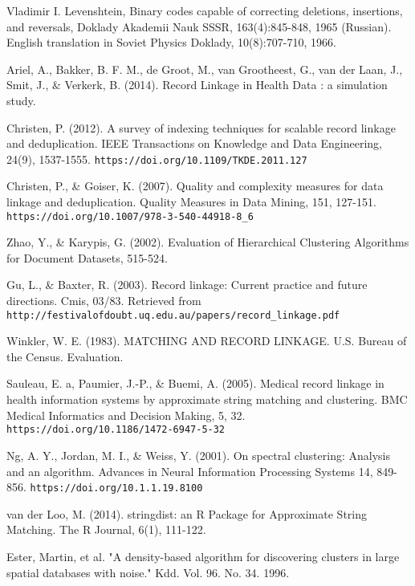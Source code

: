 \documentclass[]{article}
\begin{document}
\begin{thebibliography}{9}

Vladimir I. Levenshtein, Binary codes capable of correcting deletions, insertions, and reversals, Doklady Akademii Nauk SSSR, 163(4):845-848, 1965 (Russian). English translation in Soviet Physics Doklady, 10(8):707-710, 1966.

Ariel, A., Bakker, B. F. M., de Groot, M., van Grootheest, G., van der Laan, J., Smit, J., $\&$ Verkerk, B. (2014). Record Linkage in Health Data : a simulation study.

Christen, P. (2012). A survey of indexing techniques for scalable record linkage and deduplication. IEEE Transactions on Knowledge and Data Engineering, 24(9), 1537-1555. \texttt{https://doi.org/10.1109/TKDE.2011.127}

Christen, P., \& Goiser, K. (2007). Quality and complexity measures for data linkage and deduplication. Quality Measures in Data Mining, 151, 127-151. \texttt{https://doi.org/10.1007/978-3-540-44918-8\_6}

Zhao, Y., \& Karypis, G. (2002). Evaluation of Hierarchical Clustering Algorithms for Document Datasets, 515-524.

Gu, L., \& Baxter, R. (2003). Record linkage: Current practice and future directions. Cmis, 03/83. Retrieved from \texttt{http://festivalofdoubt.uq.edu.au/papers/record\_linkage.pdf}

Winkler, W. E. (1983). MATCHING AND RECORD LINKAGE. U.S. Bureau of the Census. Evaluation.

Sauleau, E. a, Paumier, J.-P., \& Buemi, A. (2005). Medical record linkage in health information systems by approximate string matching and clustering. BMC Medical Informatics and Decision Making, 5, 32. \texttt{https://doi.org/10.1186/1472-6947-5-32}

Ng, A. Y., Jordan, M. I., \& Weiss, Y. (2001). On spectral clustering: Analysis and an algorithm. Advances in Neural Information Processing Systems 14, 849-856. \texttt{https://doi.org/10.1.1.19.8100}

van der Loo, M. (2014). {stringdist}: an {R} Package for Approximate String Matching. The R Journal, 6(1), 111-122.

Ester, Martin, et al. "A density-based algorithm for discovering clusters in large spatial databases with noise." Kdd. Vol. 96. No. 34. 1996.

\end{thebibliography}
\end{document}
